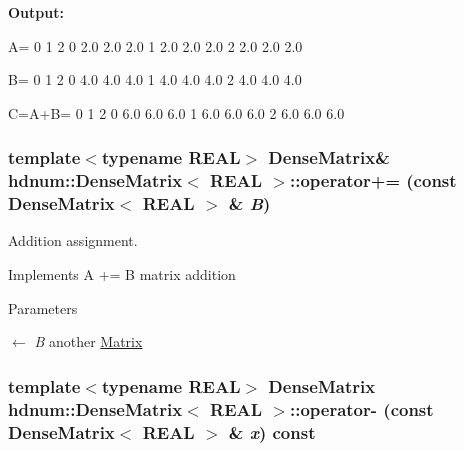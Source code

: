 {\bfseries Output:} \begin{DoxyVerb}
A=
                    0        1        2 
          0       2.0      2.0      2.0 
          1       2.0      2.0      2.0 
          2       2.0      2.0      2.0 

B=
                    0        1        2 
          0       4.0      4.0      4.0 
          1       4.0      4.0      4.0 
          2       4.0      4.0      4.0 

C=A+B=
                    0        1        2 
          0       6.0      6.0      6.0 
          1       6.0      6.0      6.0 
          2       6.0      6.0      6.0 
	  \end{DoxyVerb}
 \hypertarget{classhdnum_1_1DenseMatrix_aebf9d5238390cc39144b8eeb2d76a6f0}{
\subsubsection[{operator+=}]{\setlength{\rightskip}{0pt plus 5cm}template$<$typename REAL$>$ {\bf DenseMatrix}\& {\bf hdnum::DenseMatrix}$<$ REAL $>$::operator+= (const {\bf DenseMatrix}$<$ REAL $>$ \& {\em B})}}
\label{classhdnum_1_1DenseMatrix_aebf9d5238390cc39144b8eeb2d76a6f0}


Addition assignment. 

Implements A += B matrix addition


\begin{DoxyParams}{Parameters}
\item[\mbox{$\leftarrow$} {\em B}]another \hyperlink{classhdnum_1_1Matrix}{Matrix} \end{DoxyParams}
\hypertarget{classhdnum_1_1DenseMatrix_a0579e65186e9f546b40d718ec7502afd}{
\subsubsection[{operator-\/}]{\setlength{\rightskip}{0pt plus 5cm}template$<$typename REAL$>$ {\bf DenseMatrix} {\bf hdnum::DenseMatrix}$<$ REAL $>$::operator-\/ (const {\bf DenseMatrix}$<$ REAL $>$ \& {\em x}) const}}
\label{classhdnum_1_1DenseMatrix_a0579e65186e9f546b40d718ec7502afd}


